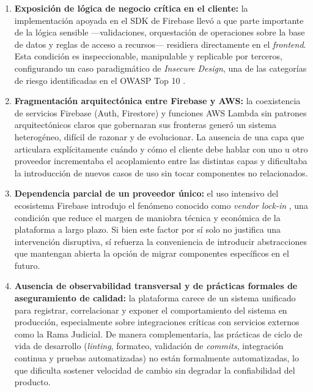 \begin{enumerate}
  \item \textbf{Exposición de lógica de negocio crítica en el cliente:} la implementación apoyada en el SDK de Firebase llevó a que parte importante de la lógica sensible —validaciones, orquestación de operaciones sobre la base de datos y reglas de acceso a recursos— residiera directamente en el \textit{frontend}. Esta condición es inspeccionable, manipulable y replicable por terceros, configurando un caso paradigmático de \textit{Insecure Design}, una de las categorías de riesgo identificadas en el OWASP Top 10 \cite{OWASP2021}.

  \item \textbf{Fragmentación arquitectónica entre Firebase y AWS:} la coexistencia de servicios Firebase (Auth, Firestore) y funciones AWS Lambda sin patrones arquitectónicos claros que gobernaran sus fronteras generó un sistema heterogéneo, difícil de razonar y de evolucionar. La ausencia de una capa que articulara explícitamente cuándo y cómo el cliente debe hablar con uno u otro proveedor incrementaba el acoplamiento entre las distintas capas y dificultaba la introducción de nuevos casos de uso sin tocar componentes no relacionados.

  \item \textbf{Dependencia parcial de un proveedor único:} el uso intensivo del ecosistema Firebase introdujo el fenómeno conocido como \textit{vendor lock-in} \cite{OparaMartins2016, OparaMartins2014, Harauzek2022}, una condición que reduce el margen de maniobra técnica y económica de la plataforma a largo plazo. Si bien este factor por sí solo no justifica una intervención disruptiva, sí refuerza la conveniencia de introducir abstracciones que mantengan abierta la opción de migrar componentes específicos en el futuro.

  \item \textbf{Ausencia de observabilidad transversal y de prácticas formales de aseguramiento de calidad:} la plataforma carece de un sistema unificado para registrar, correlacionar y exponer el comportamiento del sistema en producción, especialmente sobre integraciones críticas con servicios externos como la Rama Judicial. De manera complementaria, las prácticas de ciclo de vida de desarrollo (\textit{linting}, formateo, validación de \textit{commits}, integración continua y pruebas automatizadas) no están formalmente automatizadas, lo que dificulta sostener velocidad de cambio sin degradar la confiabilidad del producto.
\end{enumerate}

